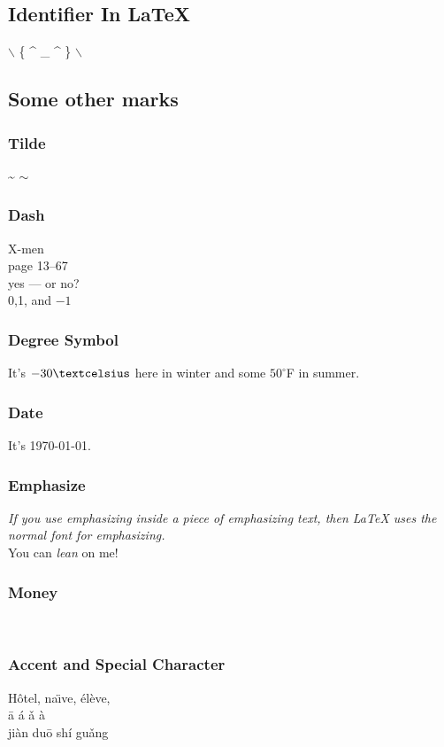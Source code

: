 \documentclass[12pt]{article}
\begin{document}
\subsection{Identifier In \LaTeX}
$\backslash$ \{ \^{} \_{} \^{} \} $\backslash$

\subsection{Some other marks}
\subsubsection{Tilde}
\~{} \qquad $\sim$  %
\subsubsection{Dash}
X-men \\
page 13--67\\
yes --- or no?\\
0,1, and $-1$

\subsubsection{Degree Symbol}
It's $-30\textcelsius$ here in winter and some $50^{\circ}$F in summer.

\subsubsection{Date}
It's \today.

\subsubsection{Emphasize}
\emph{If you use emphasizing inside a piece of emphasizing text, then \LaTeX{} uses the \emph{normal} font for emphasizing.}\\
You can \textsl{lean} on me!

\subsubsection{Money}
\texteuro \  \textdollar

\subsubsection{Accent and Special Character}
H\^otel, na\"\i ve, \'el\`eve,\\
\= a \' a \v a \` a \\
ji\` an du\= o sh\' i gu\v ang
\end{document}
